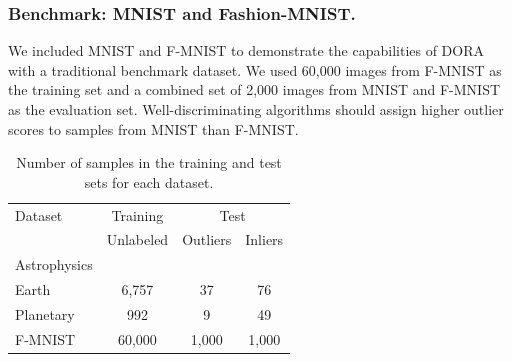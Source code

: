 \documentclass[letterpaper]{article} %
\begin{document}

\subsubsection{Benchmark: MNIST and Fashion-MNIST.}
We included MNIST and F-MNIST to demonstrate the capabilities of DORA with a
traditional benchmark dataset. We used 60,000 images from 
F-MNIST as the training set and a combined set of 2,000 images from MNIST and 
F-MNIST as the evaluation set. Well-discriminating algorithms should assign 
higher outlier scores to samples from MNIST than F-MNIST.

\begin{table}
  \caption{Number of samples in the training and test sets for each dataset.}
  \label{tab:datasets}
  \centering
  \begin{tabular}{l|c|cc}
    \hline
    Dataset & Training & \multicolumn{2}{c}{Test}\\
     & Unlabeled &  Outliers &  Inliers \\
    
    \hline
    Astrophysics &   &   &   \\
    Earth & 6,757 & 37 & 76  \\
    Planetary & 992 &  9 & 49 \\
    F-MNIST & 60,000 & 1,000 & 1,000  \\
    \hline
  \end{tabular}
\end{table}
\end{document}
